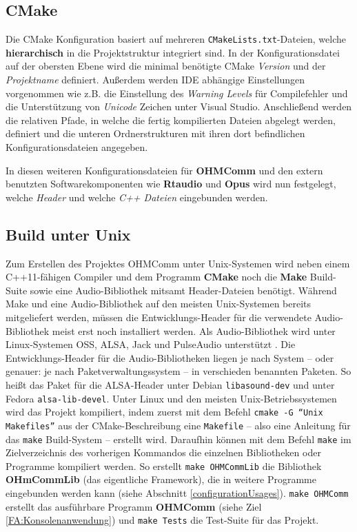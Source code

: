 \subsection{CMake}
Die CMake Konfiguration basiert auf mehreren \texttt{CMakeLists.txt}-Dateien, welche \textbf{hierarchisch} in die Projektstruktur integriert sind. In der Konfigurationsdatei auf der obersten Ebene wird die minimal benötigte CMake \textit{Version} und der \textit{Projektname} definiert.
Außerdem werden IDE abhängige Einstellungen vorgenommen wie z.B. die Einstellung des \textit{Warning Levels} für Compilefehler und die Unterstützung von \textit{Unicode} Zeichen unter Visual Studio.
Anschließend werden die relativen Pfade, in welche die fertig kompilierten Dateien abgelegt werden, definiert und die unteren Ordnerstrukturen mit ihren dort befindlichen Konfigurationsdateien angegeben.

In diesen weiteren Konfigurationsdateien für \textbf{OHMComm} und den extern benutzten Softwarekomponenten wie \textbf{Rtaudio} und \textbf{Opus} wird nun festgelegt, welche \textit{Header} und welche \textit{C++ Dateien} eingebunden werden. 

\subsection{Build unter Unix}
Zum Erstellen des Projektes OHMComm unter Unix-Systemen wird neben einem C++11-fähigen Compiler und dem Programm \textbf{CMake} noch die \textbf{Make} Build-Suite sowie eine Audio-Bibliothek mitsamt Header-Dateien benötigt. Während Make und eine Audio-Bibliothek auf den meisten Unix-Systemen bereits mitgeliefert werden, müssen die Entwicklungs-Header für die verwendete Audio-Bibliothek meist erst noch installiert werden. Als Audio-Bibliothek wird unter Linux-Systemen OSS, ALSA, Jack und PulseAudio unterstützt \cite{RTAudioAPIs}. Die Entwicklungs-Header für die Audio-Bibliotheken liegen je nach System -- oder genauer: je nach Paketverwaltungssystem -- in verschieden benannten Paketen. So heißt das Paket für die ALSA-Header unter Debian \texttt{libasound-dev} und unter Fedora \texttt{alsa-lib-devel}.
Unter Linux und den meisten Unix-Betriebssystemen wird das Projekt kompiliert, indem zuerst mit dem Befehl \texttt{cmake -G ``Unix Makefiles''} aus der CMake-Beschreibung eine \texttt{Makefile} -- also eine Anleitung für das \texttt{make} Build-System -- erstellt wird. Daraufhin können mit dem Befehl \texttt{make} im Zielverzeichnis des vorherigen Kommandos die einzelnen Bibliotheken oder Programme kompiliert werden. So erstellt \texttt{make OHMCommLib} die Bibliothek \textbf{OHmCommLib} (das eigentliche Framework), die in weitere Programme eingebunden werden kann (siehe Abschnitt \ref{configurationUsages}). \texttt{make OHMComm} erstellt das ausführbare Programm \textbf{OHMComm} (siehe Ziel \ref{FA:Konsolenanwendung}) und \texttt{make Tests} die Test-Suite für das Projekt.

